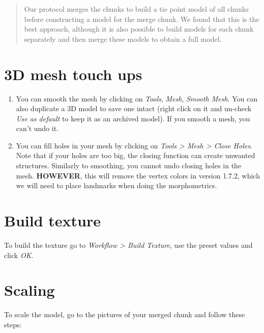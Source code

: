\documentclass[
]{book}
\begin{document}
\begin{quote}
Our protocol merges the chunks to build a tie point model of all chunks
before constructing a model for the merge chunk. We found that this is
the best approach, although it is also possible to build models for each
chunk separately and then merge these models to obtain a full model.
\end{quote}

\hypertarget{d-mesh-touch-ups}{%
\section{3D mesh touch ups}\label{d-mesh-touch-ups}}

\begin{enumerate}
\def\labelenumi{\arabic{enumi}.}
\item
  You can smooth the mesh by clicking on \emph{Tools}, \emph{Mesh}, \emph{Smooth Mesh}.
  You can also duplicate a 3D model to save one intact
  (right click on it and un-check \emph{Use as default} to keep it as an
  archived model). If you smooth a mesh, you can't undo it.
\item
  You can fill holes in your mesh by clicking on \emph{Tools \textgreater{} Mesh \textgreater{} Close Holes}.
  Note that if your holes are too big, the closing function can create unwanted
  structures. Similarly to smoothing, you cannot undo closing holes in the mesh.
  \textbf{HOWEVER}, this will remove the vertex colors in version 1.7.2, which we will need to
  place landmarks when doing the morphometrics.
\end{enumerate}

\hypertarget{build-texture}{%
\section{Build texture}\label{build-texture}}

To build the texture go to \emph{Workflow \textgreater{} Build Texture}, use the preset
values and click \emph{OK}.

\hypertarget{scaling}{%
\section{Scaling}\label{scaling}}

To scale the model, go to the pictures of your merged chunk and follow
these steps:
\end{document}
